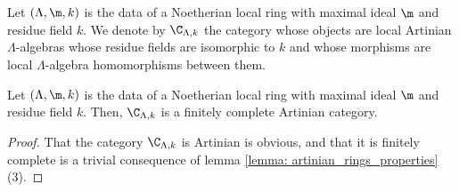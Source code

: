         \begin{convention} \label{conv: categories_of_local_artinian_algebras}
             Let $(\Lambda, \m, k)$ is the data of a Noetherian local ring with maximal ideal $\m$ and residue field $k$. We denote by $\C_{\Lambda, k}$ the category whose objects are local Artinian $\Lambda$-algebras whose residue fields are isomorphic to $k$ and whose morphisms are local $\Lambda$-algebra homomorphisms between them.
        \end{convention}
        \begin{proposition} \label{prop: finite_completeness_of_categories_of_local_artinian_algebras}
            Let $(\Lambda, \m, k)$ is the data of a Noetherian local ring with maximal ideal $\m$ and residue field $k$. Then, $\C_{\Lambda, k}$ is a finitely complete Artinian category.
        \end{proposition}
            \begin{proof}
                That the category $\C_{\Lambda, k}$ is Artinian is obvious, and that it is finitely complete is a trivial consequence of lemma \ref{lemma: artinian_rings_properties}(3).
            \end{proof}
            
